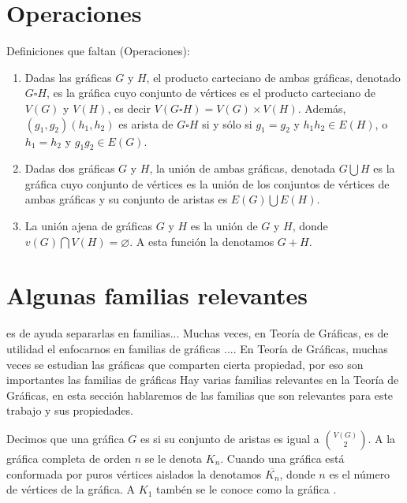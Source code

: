 \section{Operaciones}
\label{sec:operaciones}

\begin{definicion} Definiciones que faltan (Operaciones):
\begin{enumerate}
    \item Dadas las gr\'aficas $G$ y $H$, el producto carteciano de ambas
    gr\'aficas, denotado $G \square H$, es la gr\'afica cuyo conjunto de
    v\'ertices es el producto carteciano de $V(G)$ y $V(H)$, es decir $V(G
    \square H) = V(G) \times V(H)$. Adem\'as, $(g_1,g_2)(h_1,h_2)$ es arista
    de $G \square H$ si y s\'olo si $g_1 = g_2$ y $h_1h_2 \in E(H)$, o $h_1
    = h_2$ y $g_1g_2 \in E(G)$.
    \item Dadas dos gr\'aficas $G$ y $H$, la uni\'on de ambas gr\'aficas,
    denotada $G \bigcup H$ es la gr\'afica cuyo conjunto de v\'ertices es la
    uni\'on de los conjuntos de v\'ertices de ambas gr\'aficas y su conjunto
    de aristas es $E(G) \bigcup E(H)$. 
    \item La uni\'on ajena de gr\'aficas $G$ y $H$ es la uni\'on de $G$ y
    $H$, donde $v(G) \bigcap V(H) = \varnothing$. A esta funci\'on la
    denotamos $G + H$. 
\end{enumerate}
\end{definicion}


\section{Algunas familias relevantes}
\label{sec:famGraf}
    
 es de ayuda
separarlas en familias... Muchas veces, en Teor\'ia de Gr\'aficas, es de utilidad
el enfocarnos en familias de gr\'aficas .... En
Teor\'ia de Gr\'aficas, muchas veces se estudian las gr\'aficas que comparten
cierta propiedad, por eso son importantes las familias de gr\'aficas     
Hay varias familias relevantes en la Teor\'ia de Gr\'aficas, en esta
    secci\'on hablaremos de las familias que son relevantes para este trabajo y
    sus propiedades.

    Decimos que una gr\'afica $G$ es  si su
    conjunto de aristas es igual a $\binom{V(G)}{2}$. A la gr\'afica completa de
    orden $n$ se le denota $K_n$. Cuando una gr\'afica est\'a conformada por
    puros v\'ertices aislados la denotamos $\overline{K_n}$, donde $n$ es el
    n\'umero de v\'ertices de la gr\'afica. A $K_1$ tamb\'en se le conoce como
    la gr\'afica  .

